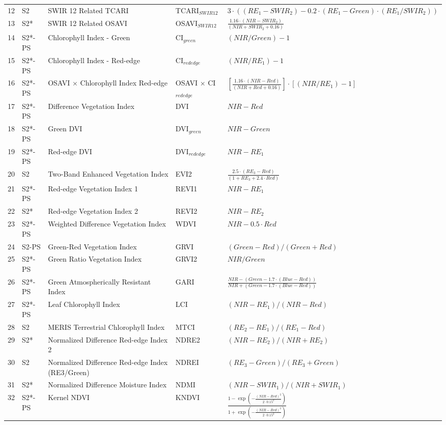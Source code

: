 \documentclass[
  british,
  suppldata]{interact}
\begin{document}
\begin{longtable}{@{}c l >{\raggedright\arraybackslash}p{3.2cm} >{\raggedright\arraybackslash}p{2.0cm} >{\raggedright\arraybackslash}p{4.6cm}@{}}
12 & S2 & SWIR 12 Related TCARI & TCARI$_{SWIR12}$ & $3 \cdot ((RE_{1} - SWIR_{2}) - 0.2 \cdot (RE_{1} - Green) \cdot (RE_{1}/SWIR_{2}))$ \\
13 & S2* & SWIR 12 Related OSAVI & OSAVI$_{SWIR12}$ & $\frac{1.16 \cdot (NIR - SWIR_{2})}{(NIR + SWIR_{2} + 0.16)}$ \\
14 & S2*-PS & Chlorophyll Index - Green & CI$_{green}$ & $(NIR/Green) - 1$ \\
15 & S2*-PS & Chlorophyll Index - Red-edge & CI$_{rededge}$ & $(NIR/RE_{1}) - 1$ \\
16 & S2*-PS & OSAVI $\times$ Chlorophyll Index Red-edge & OSAVI $\times$ CI$_{rededge}$ & $\left[\frac{1.16 \cdot (NIR - Red)}{(NIR + Red + 0.16)}\right] \cdot \left[(NIR/RE_{1}) - 1\right]$ \\
17 & S2*-PS & Difference Vegetation Index & DVI & $NIR - Red$ \\
18 & S2*-PS & Green DVI & DVI$_{green}$ & $NIR - Green$ \\
19 & S2*-PS & Red-edge DVI & DVI$_{rededge}$ & $NIR - RE_{1}$ \\
20 & S2 & Two-Band Enhanced Vegetation Index & EVI2 & $\frac{2.5 \cdot (RE_{3} - Red)}{(1 + RE_{3} + 2.4 \cdot Red)}$ \\
21 & S2*-PS & Red-edge Vegetation Index 1 & REVI1 & $NIR - RE_{1}$ \\
22 & S2* & Red-edge Vegetation Index 2 & REVI2 & $NIR - RE_{2}$ \\
23 & S2*-PS & Weighted Difference Vegetation Index & WDVI & $NIR - 0.5 \cdot Red$ \\
24 & S2-PS & Green-Red Vegetation Index & GRVI & $(Green - Red)/(Green + Red)$ \\
25 & S2*-PS & Green Ratio Vegetation Index & GRVI2 & $NIR/Green$ \\
26 & S2*-PS & Green Atmospherically Resistant Index & GARI & $\frac{NIR - (Green - 1.7 \cdot (Blue - Red))}{NIR + (Green - 1.7 \cdot (Blue - Red))}$ \\
27 & S2*-PS & Leaf Chlorophyll Index & LCI & $(NIR - RE_{1})/(NIR - Red)$ \\
28 & S2 & MERIS Terrestrial Chlorophyll Index & MTCI & $(RE_{2} - RE_{1})/(RE_{1} - Red)$ \\
29 & S2* & Normalized Difference Red-edge Index 2 & NDRE2 & $(NIR - RE_{2})/(NIR + RE_{2})$ \\
30 & S2 & Normalized Difference Red-edge Index (RE3/Green) & NDREI & $(RE_{3} - Green)/(RE_{3} + Green)$ \\
31 & S2* & Normalized Difference Moisture Index & NDMI & $(NIR - SWIR_{1})/(NIR + SWIR_{1})$ \\
32 & S2*-PS & Kernel NDVI & KNDVI & $\frac{1 - \exp\left(-\frac{(NIR-Red)^2}{2 \cdot 0.15^2}\right)}{1 + \exp\left(-\frac{(NIR-Red)^2}{2 \cdot 0.15^2}\right)}$ \\

\end{longtable}
\end{document}
